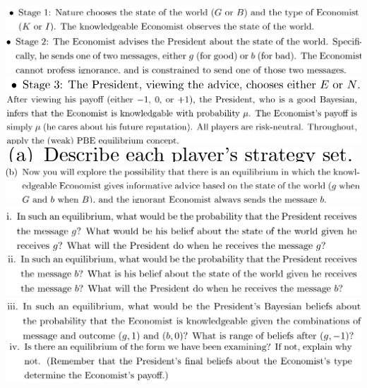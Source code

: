 \documentclass[8pt,landscape]{extarticle}
\begin{document}
\begin{multicols*}{3}
    \includegraphics[width=0.73\linewidth,keepaspectratio]{Screenshots/Screenshot 2024-03-11 170820.png}
    \includegraphics[width=0.71\linewidth,keepaspectratio]{Screenshots/Screenshot 2024-03-11 170826.png}
    \includegraphics[width=0.59\linewidth,keepaspectratio]{Screenshots/Screenshot 2024-03-11 170829.png}
    \includegraphics[width=0.75\linewidth,keepaspectratio]{Screenshots/Screenshot 2024-03-11 170836.png}
    \includegraphics[width=0.33\linewidth,keepaspectratio]{Screenshots/Screenshot 2024-03-11 170842.png}
    \includegraphics[width=0.73\linewidth,keepaspectratio]{Screenshots/Screenshot 2024-03-11 170850.png}
    \includegraphics[width=0.69\linewidth,keepaspectratio]{Screenshots/Screenshot 2024-03-11 170855.png}
    \includegraphics[width=0.7\linewidth,keepaspectratio]{Screenshots/Screenshot 2024-03-11 170901.png}
    \includegraphics[width=0.7\linewidth,keepaspectratio]{Screenshots/Screenshot 2024-03-11 170907.png}
    \includegraphics[width=0.72\linewidth,keepaspectratio]{Screenshots/Screenshot 2024-03-11 170911.png}

\end{multicols*}
\end{document}
